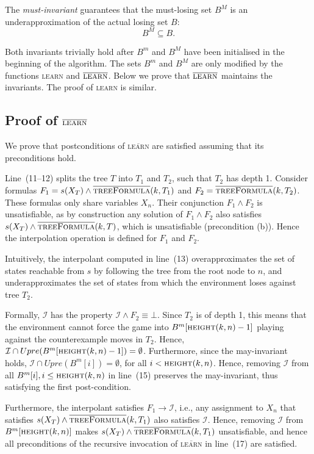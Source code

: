 \documentclass{llncs}
\newcommand{\II}{\mathcal{I}}
\newcommand{\textoverline}[1]{$\overline{\mbox{#1}}$}
\begin{document}
The \emph{must-invariant} guarantees that the must-losing set $B^M$ is an
underapproximation of the actual losing set $B$: $$B^M \subseteq B.$$

Both invariants trivially hold after $B^m$ and $B^M$ have been initialised in the
beginning of the algorithm.
The sets $B^m$ and $B^M$ are only modified by the functions \textsc{learn} and
\textoverline{\textsc{learn}}.  Below we prove that \textoverline{\textsc{learn}} 
maintains the invariants.  The proof of \textsc{learn} is similar.

\subsection{Proof of \textoverline{\textsc{learn}}}

We prove that postconditions of \textsc{\textoverline{learn}} are satisfied
assuming that its preconditions hold.

Line~(11--12) splits the tree $T$ into $T_1$ and $T_2$, such that $T_2$ has depth
1.  Consider formulas $F_1=s(X_T) \land
\textsc{\textoverline{treeFormula}}(k, T_1)$ and $F_2 =
\textsc{\textoverline{treeFormula}}(k, T_2)$.  These formulas only share variables
$X_n$.  Their conjunction $F_1 \land F_2$ is unsatisfiable, as by construction
any solution of $F_1 \land F_2$ also satisfies $s(X_T) \land
\textsc{\textoverline{treeFormula}}(k, T)$, which is unsatisfiable (precondition (b)).  Hence the
interpolation operation is defined for $F_1$ and $F_2$.  

Intuitively, the interpolant computed in line~(13) overapproximates the set of
states reachable from $s$ by following the tree from the root node to $n$,
and underapproximates the set of states from which the environment loses
against tree $T_2$.  

Formally, $\II$ has the property $\II \land F_2 \equiv \bot$.  Since $T_2$ is
of depth 1, this means that the environment cannot force the game into
$B^m[\textsc{height}(k, n)-1]$ playing against the counterexample moves in $T_2$.
Hence, $\II \cap Upre(B^m[\textsc{height}(k, n)-1]) = \emptyset$.  Furthermore,
since the may-invariant holds, $\II \cap Upre(B^m[i]) =
\emptyset$, for all $i < \textsc{height}(k, n)$.  Hence, removing $\II$ from all
$B^m[i], i\leq \textsc{height}(k, n)$ in line~(15) preserves the may-invariant,
thus satisfying the first post-condition.

Furthermore, the interpolant satisfies $F_1 \rightarrow \II$, i.e., any
assignment to $X_n$ that satisfies $s(X_T) \land
\textsc{\textoverline{treeFormula}}(k, T_1)$ also satisfies $\II$.  Hence,
removing $\II$ from $B^m[\textsc{height}(k, n)]$ makes $s(X_T) \land
\textsc{\textoverline{treeFormula}}(k, T_1)$ unsatisfiable, and hence all
preconditions of the recursive invocation of \textsc{\textoverline{learn}} in
line~(17) are satisfied.  
\end{document}
